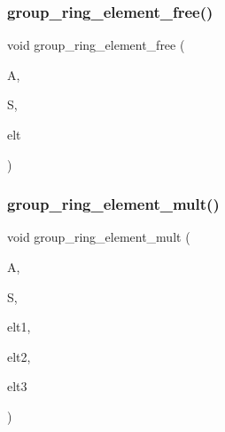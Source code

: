 \subsubsection{\texorpdfstring{group\+\_\+ring\+\_\+element\+\_\+free()}{group\_ring\_element\_free()}}
{\footnotesize\ttfamily void group\+\_\+ring\+\_\+element\+\_\+free (\begin{DoxyParamCaption}\item[{\mbox{\hyperlink{classaction}{action}} $\ast$}]{A,  }\item[{\mbox{\hyperlink{classsims}{sims}} $\ast$}]{S,  }\item[{\mbox{\hyperlink{galois_8h_a09fddde158a3a20bd2dcadb609de11dc}{I\+NT}} $\ast$}]{elt }\end{DoxyParamCaption})}

\mbox{\label{action__global_8_c_a0ac80b53427a7aa24a18f9f860819a6d}} 
\subsubsection{\texorpdfstring{group\+\_\+ring\+\_\+element\+\_\+mult()}{group\_ring\_element\_mult()}}
{\footnotesize\ttfamily void group\+\_\+ring\+\_\+element\+\_\+mult (\begin{DoxyParamCaption}\item[{\mbox{\hyperlink{classaction}{action}} $\ast$}]{A,  }\item[{\mbox{\hyperlink{classsims}{sims}} $\ast$}]{S,  }\item[{\mbox{\hyperlink{galois_8h_a09fddde158a3a20bd2dcadb609de11dc}{I\+NT}} $\ast$}]{elt1,  }\item[{\mbox{\hyperlink{galois_8h_a09fddde158a3a20bd2dcadb609de11dc}{I\+NT}} $\ast$}]{elt2,  }\item[{\mbox{\hyperlink{galois_8h_a09fddde158a3a20bd2dcadb609de11dc}{I\+NT}} $\ast$}]{elt3 }\end{DoxyParamCaption})}

\mbox{\label{action__global_8_c_ade71b852e79498cf1119faf78034b7b2}} 
